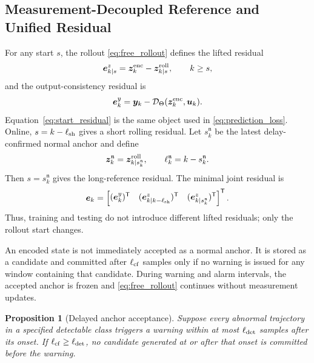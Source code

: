 \documentclass[journal]{IEEEtran}
\newtheorem{proposition}{Proposition}
\newcommand{\T}{\mathsf T}
\newcommand{\1}{\bm 1}
\begin{document}
\subsection{Measurement-Decoupled Reference and Unified Residual}
For any start $s$, the rollout \eqref{eq:free_rollout} defines the lifted
residual
\begin{equation}
\bm e_{k\mid s}^z=\bm z_k^{\rm enc}-\bm z_{k\mid s}^{\rm roll},
\qquad k\geq s,
\label{eq:start_residual}
\end{equation}
and the output-consistency residual is
\begin{equation}
\bm e_k^y=\bm y_k-
\mathcal D_\Theta(\bm z_k^{\rm enc},\bm u_k).
\label{eq:output_residual}
\end{equation}
Equation~\eqref{eq:start_residual} is the same object used in
\eqref{eq:prediction_loss}. Online, $s=k-\ell_{\rm sh}$ gives a short rolling
residual. Let $s_k^{\mathfrak n}$ be the latest delay-confirmed normal anchor
and define
\begin{equation}
\bm z_k^{\mathfrak n}=\bm z_{k\mid s_k^{\mathfrak n}}^{\rm roll},\qquad
\ell_k^{\mathfrak n}=k-s_k^{\mathfrak n}.
\label{eq:normal_reference}
\end{equation}
Then $s=s_k^{\mathfrak n}$ gives the long-reference residual. The minimal
joint residual is
\begin{equation}
\bm e_k=
\begin{bmatrix}
(\bm e_k^y)^\T&
(\bm e_{k\mid k-\ell_{\rm sh}}^z)^\T&
(\bm e_{k\mid s_k^{\mathfrak n}}^z)^\T
\end{bmatrix}^{\T}.
\label{eq:joint_residual}
\end{equation}
Thus, training and testing do not introduce different lifted residuals; only
the rollout start changes.

An encoded state is not immediately accepted as a normal anchor. It is stored
as a candidate and committed after $\ell_{\rm cf}$ samples only if no warning
is issued for any window containing that candidate. During warning and alarm
intervals, the accepted anchor is frozen and \eqref{eq:free_rollout} continues
without measurement updates.

\begin{proposition}[Delayed anchor acceptance]
\label{prop:anchor}
Suppose every abnormal trajectory in a specified detectable class triggers a
warning within at most $\ell_{\rm det}$ samples after its onset. If
$\ell_{\rm cf}\geq\ell_{\rm det}$, no candidate generated at or after that
onset is committed before the warning.
\end{proposition}
\end{document}
